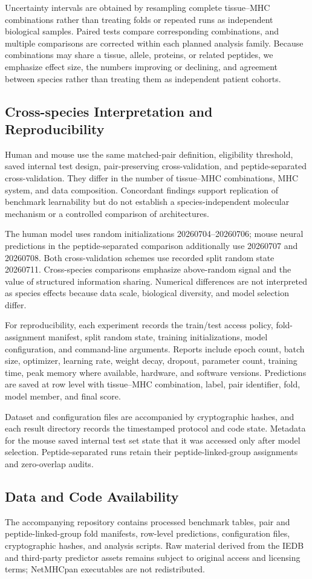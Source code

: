 Uncertainty intervals are obtained by resampling complete tissue--MHC combinations rather than treating folds or repeated runs as independent biological samples. Paired tests compare corresponding combinations, and multiple comparisons are corrected within each planned analysis family. Because combinations may share a tissue, allele, proteins, or related peptides, we emphasize effect size, the numbers improving or declining, and agreement between species rather than treating them as independent patient cohorts.

\subsection{Cross-species Interpretation and Reproducibility}

Human and mouse use the same matched-pair definition, eligibility threshold, saved internal test design, pair-preserving cross-validation, and peptide-separated cross-validation. They differ in the number of tissue--MHC combinations, MHC system, and data composition. Concordant findings support replication of benchmark learnability but do not establish a species-independent molecular mechanism or a controlled comparison of architectures.

The human model uses random initializations 20260704--20260706; mouse neural predictions in the peptide-separated comparison additionally use 20260707 and 20260708. Both cross-validation schemes use recorded split random state 20260711. Cross-species comparisons emphasize above-random signal and the value of structured information sharing. Numerical differences are not interpreted as species effects because data scale, biological diversity, and model selection differ.

For reproducibility, each experiment records the train/test access policy, fold-assignment manifest, split random state, training initializations, model configuration, and command-line arguments. Reports include epoch count, batch size, optimizer, learning rate, weight decay, dropout, parameter count, training time, peak memory where available, hardware, and software versions. Predictions are saved at row level with tissue--MHC combination, label, pair identifier, fold, model member, and final score.

Dataset and configuration files are accompanied by cryptographic hashes, and each result directory records the timestamped protocol and code state. Metadata for the mouse saved internal test set state that it was accessed only after model selection. Peptide-separated runs retain their peptide-linked-group assignments and zero-overlap audits.

\subsection{Data and Code Availability}

The accompanying repository contains processed benchmark tables, pair and peptide-linked-group fold manifests, row-level predictions, configuration files, cryptographic hashes, and analysis scripts. Raw material derived from the IEDB and third-party predictor assets remains subject to original access and licensing terms; NetMHCpan executables are not redistributed.
